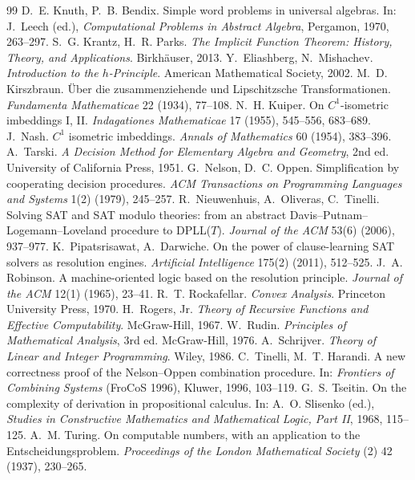 \begin{thebibliography}{99}
 D.~E. Knuth, P.~B. Bendix. Simple word problems in universal algebras. In: J.~Leech (ed.), \emph{Computational Problems in Abstract Algebra}, Pergamon, 1970, 263--297.
 S.~G. Krantz, H.~R. Parks. \emph{The Implicit Function Theorem: History, Theory, and Applications}. Birkh\"auser, 2013.
 Y.~Eliashberg, N.~Mishachev. \emph{Introduction to the $h$-Principle}. American Mathematical Society, 2002.
 M.~D. Kirszbraun. \"{U}ber die zusammenziehende und Lipschitzsche Transformationen. \emph{Fundamenta Mathematicae} 22 (1934), 77--108.
 N.~H. Kuiper. On $C^1$-isometric imbeddings I, II. \emph{Indagationes Mathematicae} 17 (1955), 545--556, 683--689.
 J.~Nash. $C^1$ isometric imbeddings. \emph{Annals of Mathematics} 60 (1954), 383--396.
 A.~Tarski. \emph{A Decision Method for Elementary Algebra and Geometry}, 2nd ed. University of California Press, 1951.
 G.~Nelson, D.~C. Oppen. Simplification by cooperating decision procedures. \emph{ACM Transactions on Programming Languages and Systems} 1(2) (1979), 245--257.
 R.~Nieuwenhuis, A.~Oliveras, C.~Tinelli. Solving SAT and SAT modulo theories: from an abstract Davis--Putnam--Logemann--Loveland procedure to DPLL($T$). \emph{Journal of the ACM} 53(6) (2006), 937--977.
 K.~Pipatsrisawat, A.~Darwiche. On the power of clause-learning SAT solvers as resolution engines. \emph{Artificial Intelligence} 175(2) (2011), 512--525.
 J.~A. Robinson. A machine-oriented logic based on the resolution principle. \emph{Journal of the ACM} 12(1) (1965), 23--41.
 R.~T. Rockafellar. \emph{Convex Analysis}. Princeton University Press, 1970.
 H.~Rogers, Jr. \emph{Theory of Recursive Functions and Effective Computability}. McGraw-Hill, 1967.
 W.~Rudin. \emph{Principles of Mathematical Analysis}, 3rd ed. McGraw-Hill, 1976.
 A.~Schrijver. \emph{Theory of Linear and Integer Programming}. Wiley, 1986.
 C.~Tinelli, M.~T. Harandi. A new correctness proof of the Nelson--Oppen combination procedure. In: \emph{Frontiers of Combining Systems} (FroCoS 1996), Kluwer, 1996, 103--119.
 G.~S. Tseitin. On the complexity of derivation in propositional calculus. In: A.~O. Slisenko (ed.), \emph{Studies in Constructive Mathematics and Mathematical Logic, Part II}, 1968, 115--125.
 A.~M. Turing. On computable numbers, with an application to the Entscheidungsproblem. \emph{Proceedings of the London Mathematical Society} (2) 42 (1937), 230--265.


\end{thebibliography}
